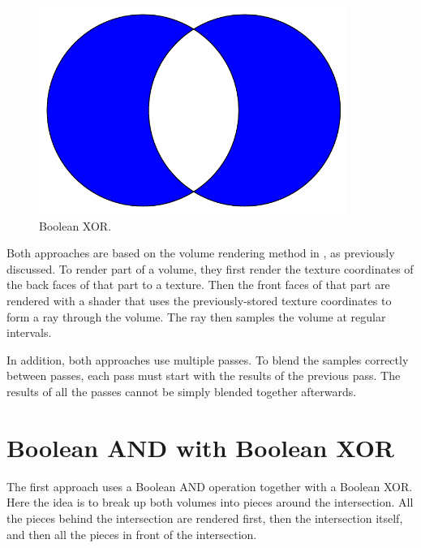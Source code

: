 \documentclass{report}
\begin{document}
\begin{figure}
\centering
\includegraphics[width=0.9\textwidth]{venn-xor.pdf}
\caption{Boolean XOR.}
\label{boolean-xor-venn-diagram}
\end{figure}

Both approaches are based on the volume rendering method in \cite{Kruger03}, as
previously discussed.  To render part of a volume, they first render the texture
coordinates of the back faces of that part to a texture.  Then the front faces
of that part are rendered with a shader that uses the previously-stored texture
coordinates to form a ray through the volume.  The ray then samples the volume
at regular intervals.

In addition, both approaches use multiple passes.  To blend the samples
correctly between passes, each pass must start with the results of the previous
pass.  The results of all the passes cannot be simply blended together
afterwards.

\section{Boolean AND with Boolean XOR}

The first approach uses a Boolean AND operation together with a Boolean XOR.
Here the idea is to break up both volumes into pieces around the intersection.
All the pieces behind the intersection are rendered first, then the intersection
itself, and then all the pieces in front of the intersection.
\end{document}
